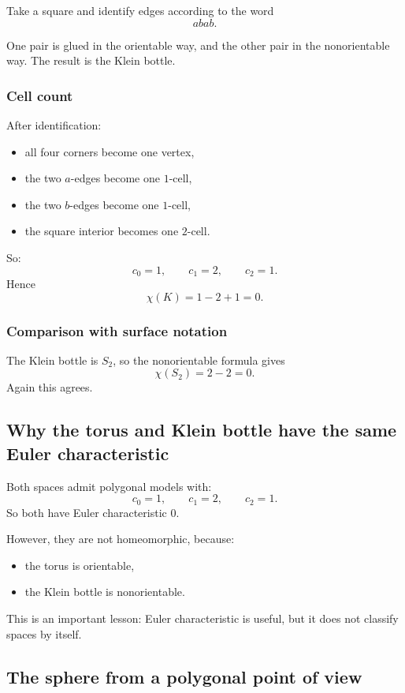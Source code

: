 \documentclass[12pt,a4paper]{article}
\theoremstyle{notespace}
\begin{document}
Take a square and identify edges according to the word
\[
aba b.
\]

One pair is glued in the orientable way, and the other pair in the nonorientable way. The result is the Klein bottle.

\subsubsection*{Cell count}

After identification:
\begin{itemize}
	\item all four corners become one vertex,
	\item the two \(a\)-edges become one \(1\)-cell,
	\item the two \(b\)-edges become one \(1\)-cell,
	\item the square interior becomes one \(2\)-cell.
\end{itemize}

So:
\[
c_0=1,\qquad c_1=2,\qquad c_2=1.
\]
Hence
\[
\chi(K)=1-2+1=0.
\]

\subsubsection*{Comparison with surface notation}

The Klein bottle is \(S_2\), so the nonorientable formula gives
\[
\chi(S_2)=2-2=0.
\]
Again this agrees.

\subsection{Why the torus and Klein bottle have the same Euler characteristic}

Both spaces admit polygonal models with:
\[
c_0=1,\qquad c_1=2,\qquad c_2=1.
\]
So both have Euler characteristic \(0\).

However, they are not homeomorphic, because:
\begin{itemize}
	\item the torus is orientable,
	\item the Klein bottle is nonorientable.
\end{itemize}

This is an important lesson: Euler characteristic is useful, but it does not classify spaces by itself.

\subsection{The sphere from a polygonal point of view}
\end{document}
